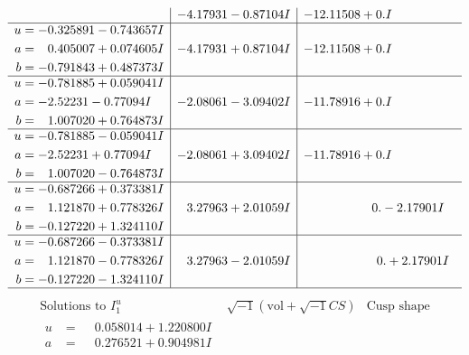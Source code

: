 \documentclass[1p]{elsarticle_modified}
\theoremstyle{definition}
\newcommand{\I}{\sqrt{-1}}
\begin{document}
$$\begin{array}{c|c|c}
 & -4.17931 - 0.87104 I & -12.11508 + 0. I\phantom{ +0.000000I} \\ \hline\begin{aligned}
u &= -0.325891 - 0.743657 I \\
a &= \phantom{-}0.405007 + 0.074605 I \\
b &= -0.791843 + 0.487373 I\end{aligned}
 & -4.17931 + 0.87104 I & -12.11508 + 0. I\phantom{ +0.000000I} \\ \hline\begin{aligned}
u &= -0.781885 + 0.059041 I \\
a &= -2.52231 - 0.77094 I \\
b &= \phantom{-}1.007020 + 0.764873 I\end{aligned}
 & -2.08061 - 3.09402 I & -11.78916 + 0. I\phantom{ +0.000000I} \\ \hline\begin{aligned}
u &= -0.781885 - 0.059041 I \\
a &= -2.52231 + 0.77094 I \\
b &= \phantom{-}1.007020 - 0.764873 I\end{aligned}
 & -2.08061 + 3.09402 I & -11.78916 + 0. I\phantom{ +0.000000I} \\ \hline\begin{aligned}
u &= -0.687266 + 0.373381 I \\
a &= \phantom{-}1.121870 + 0.778326 I \\
b &= -0.127220 + 1.324110 I\end{aligned}
 & \phantom{-}3.27963 + 2.01059 I & \phantom{-0.000000 } 0. - 2.17901 I \\ \hline\begin{aligned}
u &= -0.687266 - 0.373381 I \\
a &= \phantom{-}1.121870 - 0.778326 I \\
b &= -0.127220 - 1.324110 I\end{aligned}
 & \phantom{-}3.27963 - 2.01059 I & \phantom{-0.000000 -}0. + 2.17901 I\\
 \hline 
 \end{array}$$\newpage$$\begin{array}{c|c|c}  
\text{Solutions to }I^u_{1}& \I (\text{vol} + \sqrt{-1}CS) & \text{Cusp shape}\\
 \hline 
\begin{aligned}
u &= \phantom{-}0.058014 + 1.220800 I \\
a &= \phantom{-}0.276521 + 0.904981 I \\

\end{aligned}
\end{array}$$
\end{document}
